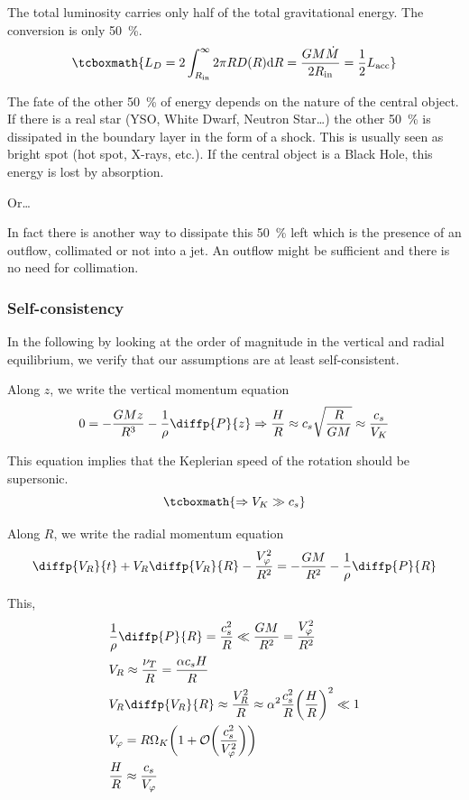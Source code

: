 \documentclass[10pt,a4paper,english]{article}
\let\originalleft\left
\let\originalright\right
\renewcommand{\left}{\mathopen{}\mathclose\bgroup\originalleft}
\renewcommand{\right}{\aftergroup\egroup\originalright}
\begin{document}
The total luminosity carries only half of the total gravitational energy. The
conversion is only \SI{50}{\percent}.
\begin{equation}
    \tcboxmath{
        L_D = 2 \int_{R_\mathrm{in}}^{\infty} 2 \pi R D(R) \d{R} = \frac{G M \dot{M}}{2 R_\mathrm{in}} = \frac{1}{2} L_\mathrm{acc}
    }
\end{equation}

The fate of the other \SI{50}{\percent} of energy depends on the nature of the
central object. If there is a real star (YSO, White Dwarf, Neutron Star…) the
other \SI{50}{\percent} is dissipated in the boundary layer in the form of a
shock. This is usually seen as bright spot (hot spot, X-rays, etc.). If the
central object is a Black Hole, this energy is lost by absorption.

Or…

In fact there is another way to dissipate this \SI{50}{\percent} left which is
the presence of an outflow, collimated or not into a jet. An outflow might be
sufficient and there is no need for collimation.

\subsubsection{Self-consistency}

In the following by looking at the order of magnitude in the vertical and
radial equilibrium, we verify that our assumptions are at least
self-consistent.

Along $z$, we write the vertical momentum equation
\begin{equation}
    0 = - \frac{G M z} {R^3} - \frac{1}{\rho} \diffp{P}{z} \Rightarrow \frac{H}{R} \approx c_s \sqrt{\frac{R}{G M}} \approx \frac{c_s}{V_K}
\end{equation}

This equation implies that the Keplerian speed of the rotation should be supersonic.
\begin{equation}
    \tcboxmath{
        \Rightarrow V_K \gg c_s
    }
\end{equation}

Along $R$, we write the radial momentum equation
\begin{equation}
    \diffp{V_R}{t} + V_R \diffp{V_R}{R} - \frac{V_\varphi^2}{R^2} = - \frac{G M}{R^2} - \frac{1}{\rho} \diffp{P}{R}
\end{equation}

This,
\begin{align*}
    & \frac{1}{\rho} \diffp{P}{R} = \frac{c_s^2}{R} \ll \frac{G M}{R^2} = \frac{V_\varphi^2}{R^2} \\
    & V_R \approx \frac{\nu_T}{R} = \frac{\alpha c_s H}{R} \\
    & V_R \diffp{V_R}{R} \approx \frac{V_R^2}{R} \approx \alpha^2 \frac{c_s^2}{R} \left(\frac{H}{R}\right)^2 \ll 1\\
    & V_\varphi = R \Omega_K \left(1 + \mathcal{O}\left(\frac{c_s^2}{V_\varphi^2}\right) \right) \\
    & \frac{H}{R} \approx \frac{c_s}{V_\varphi}
\end{align*}
\end{document}
